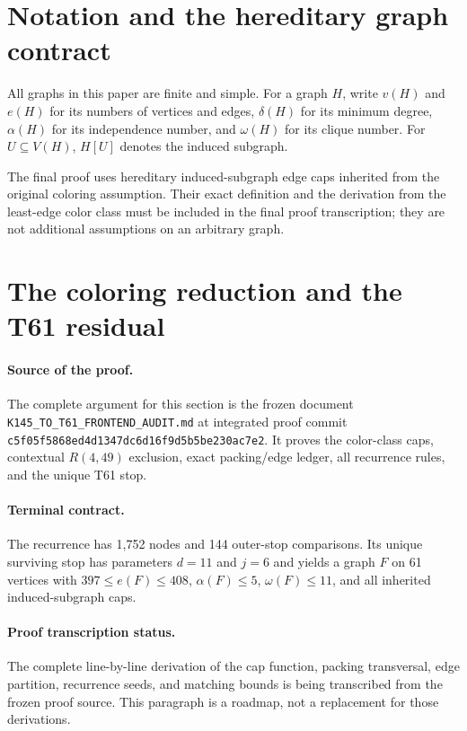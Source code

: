 \documentclass[11pt]{article}
\theoremstyle{definition}
\theoremstyle{remark}
\begin{document}
\section{Notation and the hereditary graph contract}

All graphs in this paper are finite and simple. For a graph $H$, write
$v(H)$ and $e(H)$ for its numbers of vertices and edges, $\delta(H)$ for
its minimum degree, $\alpha(H)$ for its independence number, and
$\omega(H)$ for its clique number. For $U\subseteq V(H)$, $H[U]$ denotes
the induced subgraph.

The final proof uses hereditary induced-subgraph edge caps inherited from
the original coloring assumption. Their exact definition and the derivation
from the least-edge color class must be included in the final proof
transcription; they are not additional assumptions on an arbitrary graph.

\section{The coloring reduction and the T61 residual}
\label{sec:reduction}

\paragraph{Source of the proof.}
The complete argument for this section is the frozen document
\texttt{K145\_TO\_T61\_FRONTEND\_AUDIT.md} at integrated proof commit
\texttt{c5f05f5868ed4d1347dc6d16f9d5b5be230ac7e2}. It proves the
color-class caps, contextual $R(4,49)$ exclusion, exact packing/edge ledger,
all recurrence rules, and the unique T61 stop.

\paragraph{Terminal contract.}
The recurrence has 1,752 nodes and 144 outer-stop comparisons. Its unique
surviving stop has parameters $d=11$ and $j=6$ and yields a graph $F$ on
61 vertices with $397\leq e(F)\leq408$, $\alpha(F)\leq5$,
$\omega(F)\leq11$, and all inherited induced-subgraph caps.

\paragraph{Proof transcription status.}
The complete line-by-line derivation of the cap function, packing
transversal, edge partition, recurrence seeds, and matching bounds is being
transcribed from the frozen proof source. This paragraph is a roadmap, not a
replacement for those derivations.
\end{document}
